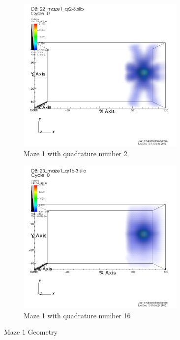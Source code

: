 \documentclass[10pt]{article}
\begin{document}
\begin{figure}[!ht]
\centering
\begin{subfigure}{0.49\textwidth}
\centering
\includegraphics[width = 0.9\textwidth]{visit/visit-maze1-02}
\caption{Maze 1 with quadrature number 2}
\label{visit:maze1-02}
\end{subfigure}
\hfill
\begin{subfigure}{0.49\textwidth}
\centering
\includegraphics[width = 0.9\textwidth]{visit/visit-maze1-16}
\caption{Maze 1 with quadrature number 16}
\label{visit:maze1-16}
\end{subfigure}
\caption{Maze 1 Geometry}
\label{visit:maze1}
\end{figure}
\end{document}
